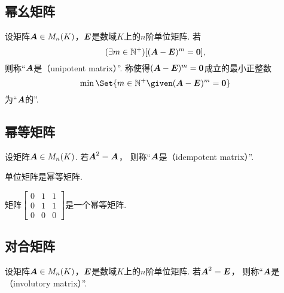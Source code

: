\subsection{幂幺矩阵}
\begin{definition}
设矩阵\(\boldsymbol{A} \in M_n(K)\)，\(\boldsymbol{E}\)是数域\(K\)上的\(n\)阶单位矩阵.
若\begin{equation*}
	(\exists m\in\mathbb{N}^+)
	[(\boldsymbol{A}-\boldsymbol{E})^m=\boldsymbol0],
\end{equation*}
则称“\(\boldsymbol{A}\)是（unipotent matrix）”.
称使得\((\boldsymbol{A}-\boldsymbol{E})^m=\boldsymbol0\)成立的最小正整数\begin{equation*}
    \min\Set{ m\in\mathbb{N}^+ \given (\vb{A}-\vb{E})^m=\vb0 }
\end{equation*}为“\(\boldsymbol{A}\)的”.
\end{definition}

\subsection{幂等矩阵}
\begin{definition}\label{definition:幂等矩阵.幂等矩阵的定义}
设矩阵\(\boldsymbol{A} \in M_n(K)\).
若\(\boldsymbol{A}^2=\boldsymbol{A}\)，
则称“\(\boldsymbol{A}\)是（idempotent matrix）”.
\end{definition}

\begin{example}
单位矩阵是幂等矩阵.
\end{example}

\begin{example}
矩阵\(
	\begin{bmatrix}
		0 & 1 & 1 \\
		0 & 1 & 1 \\
		0 & 0 & 0
	\end{bmatrix}
\)是一个幂等矩阵.
\end{example}

\subsection{对合矩阵}
\begin{definition}
设矩阵\(\boldsymbol{A} \in M_n(K)\)，\(\boldsymbol{E}\)是数域\(K\)上的\(n\)阶单位矩阵.
若\(\boldsymbol{A}^2=\boldsymbol{E}\)，
则称“\(\boldsymbol{A}\)是（involutory matrix）”.
\end{definition}

